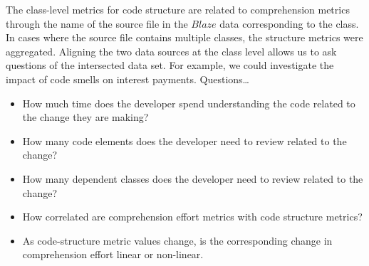 The class-level metrics for code structure are related to comprehension metrics through the name of the source file in the $Blaze$ data corresponding to the class.  In cases where the source file contains multiple classes, the structure metrics were aggregated.
Aligning the two data sources at the class level allows us to ask questions of the intersected data set. For example, we could investigate the impact of code smells on interest payments. Questions\ldots{}
\begin{itemize}
    \item[] How much time does the developer spend understanding the code related to the change they are making?
    \item[] How many code elements does the developer need to review related to the change?
    \item[] How many dependent classes does the developer need to review related to the change?
    \item[] How correlated are comprehension effort metrics with code structure metrics?
    \item[] As code-structure metric values change, is the corresponding change in comprehension effort linear or non-linear.
\end{itemize}


